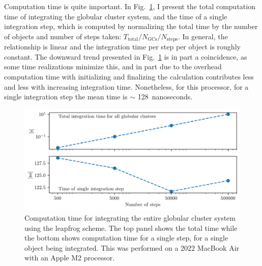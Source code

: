         Computation time is quite important. In Fig.~\ref{fig:numericalErrorGlobularClustersComputationTime}, I present the total computation time of integrating the globular cluster system, and the time of a single integration step, which is computed by normalizing the total time by the number of objects and number of steps taken: $T_{\mathrm{total}}/N_{\mathrm{GCs}}/N_{\mathrm{steps}}$. In general, the relationship is linear and the integration time per step per object is roughly constant. The downward trend presented in Fig.~\ref{fig:numericalErrorGlobularClustersComputationTime} is in part a coincidence, as some time realizations minimize this, and in part due to the overhead computation time with initializing and finalizing the calculation contributes less and less with increasing integration time. Nonetheless, for this processor, for a single integration step the mean time is $\sim$ 128~nanoseconds. 
        \begin{figure}
            \centering
            \includegraphics[width=\linewidth]{images/numericalErrorGlobularClustersComputationTime.png}
            \caption{Computation time for integrating the entire globular cluster system using the leapfrog scheme. The top panel shows the total time while the bottom shows computation time for a single step, for a single object being integrated. This was performed on a 2022 MacBook Air with an Apple M2 processor. }
            \label{fig:numericalErrorGlobularClustersComputationTime}
        \end{figure}

